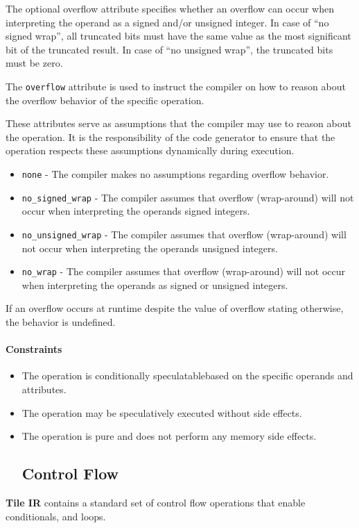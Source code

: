 \documentclass{article}
\begin{document}
The optional overflow attribute specifies whether an overflow can occur when interpreting the operand as a signed and/or unsigned integer. In case of ``no signed wrap'', all truncated bits must have the same value as the most significant bit of the truncated result. In case of ``no unsigned wrap'', the truncated bits must be zero.


The \texttt{overflow} attribute is used to instruct the compiler on how to reason about the overflow behavior of the specific operation.


These attributes serve as assumptions that the compiler may use to reason about the operation. It is the responsibility of the code generator to ensure that the operation respects these assumptions dynamically during execution.


\begin{itemize}
\item \texttt{none} - The compiler makes no assumptions regarding overflow behavior.
\item \texttt{no\_signed\_wrap} - The compiler assumes that overflow (wrap-around) will not occur when interpreting the operands signed integers.
\item \texttt{no\_unsigned\_wrap} - The compiler assumes that overflow (wrap-around) will not occur when interpreting the operands unsigned integers.
\item \texttt{no\_wrap} - The compiler assumes that overflow (wrap-around) will not occur when interpreting the operands as signed or unsigned integers.

\end{itemize}
If an overflow occurs at runtime despite the value of overflow stating otherwise, the behavior is undefined.



\paragraph{Constraints}

\begin{itemize}
\item The operation is conditionally speculatablebased on the specific operands and attributes.
\item The operation may be speculatively executed without side effects.
\item The operation is pure and does not perform any memory side effects.



\subsection{Control Flow}

\end{itemize}
\textbf{Tile IR} contains a standard set of control flow operations that enable conditionals, and loops.
\end{document}

